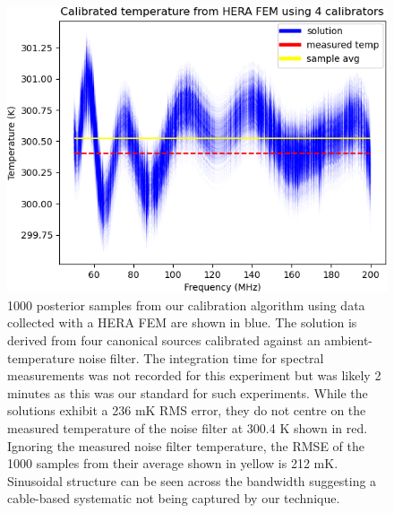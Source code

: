 \begin{figure}
    \centering
    \includegraphics[width=.8\textwidth]{hera_results}
    \caption{1000 posterior samples from our calibration algorithm using data collected with a HERA FEM are shown in blue. The solution is derived from four canonical sources calibrated against an ambient-temperature noise filter. The integration time for spectral measurements was not recorded for this experiment but was likely 2 minutes as this was our standard for such experiments. While the solutions exhibit a 236 mK RMS error, they do not centre on the measured temperature of the noise filter at 300.4 K shown in red. Ignoring the measured noise filter temperature, the RMSE of the 1000 samples from their average shown in yellow is 212 mK. Sinusoidal structure can be seen across the bandwidth suggesting a cable-based systematic not being captured by our technique.}
    \label{fig:hera_results}
\end{figure}


